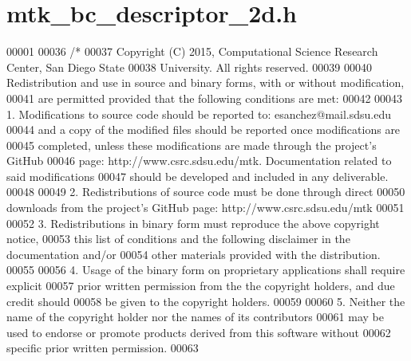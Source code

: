 \hypertarget{mtk__bc__descriptor__2d_8h_source}{\section{mtk\+\_\+bc\+\_\+descriptor\+\_\+2d.\+h}
\label{mtk__bc__descriptor__2d_8h_source}
}

\begin{DoxyCode}
00001 
00036 \textcolor{comment}{/*}
00037 \textcolor{comment}{Copyright (C) 2015, Computational Science Research Center, San Diego State}
00038 \textcolor{comment}{University. All rights reserved.}
00039 \textcolor{comment}{}
00040 \textcolor{comment}{Redistribution and use in source and binary forms, with or without modification,}
00041 \textcolor{comment}{are permitted provided that the following conditions are met:}
00042 \textcolor{comment}{}
00043 \textcolor{comment}{1. Modifications to source code should be reported to: esanchez@mail.sdsu.edu}
00044 \textcolor{comment}{and a copy of the modified files should be reported once modifications are}
00045 \textcolor{comment}{completed, unless these modifications are made through the project's GitHub}
00046 \textcolor{comment}{page: http://www.csrc.sdsu.edu/mtk. Documentation related to said modifications}
00047 \textcolor{comment}{should be developed and included in any deliverable.}
00048 \textcolor{comment}{}
00049 \textcolor{comment}{2. Redistributions of source code must be done through direct}
00050 \textcolor{comment}{downloads from the project's GitHub page: http://www.csrc.sdsu.edu/mtk}
00051 \textcolor{comment}{}
00052 \textcolor{comment}{3. Redistributions in binary form must reproduce the above copyright notice,}
00053 \textcolor{comment}{this list of conditions and the following disclaimer in the documentation and/or}
00054 \textcolor{comment}{other materials provided with the distribution.}
00055 \textcolor{comment}{}
00056 \textcolor{comment}{4. Usage of the binary form on proprietary applications shall require explicit}
00057 \textcolor{comment}{prior written permission from the the copyright holders, and due credit should}
00058 \textcolor{comment}{be given to the copyright holders.}
00059 \textcolor{comment}{}
00060 \textcolor{comment}{5. Neither the name of the copyright holder nor the names of its contributors}
00061 \textcolor{comment}{may be used to endorse or promote products derived from this software without}
00062 \textcolor{comment}{specific prior written permission.}
00063 \textcolor{comment}{}

\end{DoxyCode}
